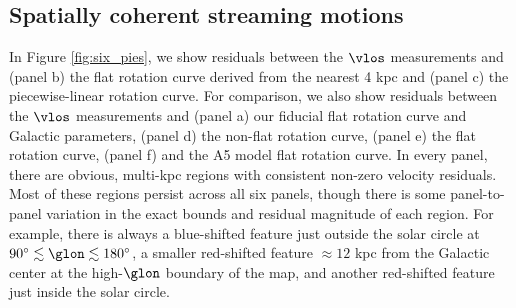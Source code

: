

\subsection{Spatially coherent streaming motions}
\label{sec:rotation_discussion}
In Figure \ref{fig:six_pies}, we show residuals between the $\vlos$ measurements and (panel b) the flat rotation curve derived from the nearest 4 kpc and (panel c) the piecewise-linear rotation curve. 
For comparison, we also show residuals between the $\vlos$ measurements and (panel a) our fiducial flat rotation curve and Galactic parameters, (panel d) the \Clemens non-flat rotation curve, (panel e) the \cite{2012ApJ...759..131B} flat rotation curve, (panel f) and the \Reid A5 model flat rotation curve.
In every panel, there are obvious, multi-kpc regions with consistent non-zero velocity residuals.
Most of these regions persist across all six panels, though there is some panel-to-panel variation in the exact bounds and residual magnitude of each region. 
For example, there is always a blue-shifted feature just outside the solar circle at $90^\circ \lesssim \glon \lesssim 180^\circ$, a smaller red-shifted feature $\approx 12$ kpc from the Galactic center at the high-$\glon$ boundary of the map, and another red-shifted feature just inside the solar circle. 

